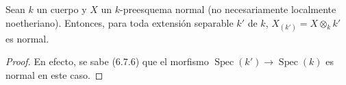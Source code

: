 \begin{corollary}[6.14.2]
\label{IV.2.s6.14.2-fr}
Sean $k$ un cuerpo y $X$ un $k$-preesquema normal \textup{(no necesariamente
localmente noetheriano)}. Entonces, para toda extensión separable
$k'$ de $k$, $X_{(k')}=X\otimes_k k'$ es normal.
\end{corollary}

\begin{proof}
En efecto, se sabe (6.7.6) que el morfismo
$\operatorname{Spec}(k')\to\operatorname{Spec}(k)$ es normal en este
caso.
\end{proof}

